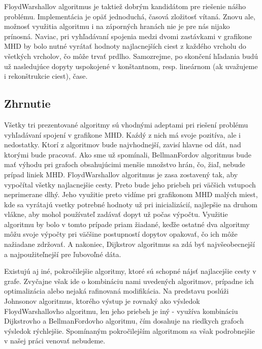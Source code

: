 Floyd\textendash Warshallov algoritmus je taktiež dobrým kandidátom pre riešenie nášho problému. Implementácia je opäť jednoduchá, časová zložitosť vítaná. Znovu ale, možnosť využitia algoritmu i na záporných hranách nie je pre nás nijako prínosná. Naviac, pri vyhľadávaní spojenia medzi dvomi zastávkami v grafikone MHD by bolo nutné vyrátať hodnoty najlacnejších ciest z každého vrcholu do všetkých vrcholov, čo môže trvať prdlho. Samozrejme, po skončení hľadania budú už nasledujúce dopyty uspokojené v konštantnom, resp. lineárnom (ak uvažujeme i rekonštrukcie ciest), čase.\newline


\subsection{Zhrnutie}
\label{vyhlad_alg_zhrnutie}

Všetky tri prezentované algoritmy sú vhodnými adeptami pri riešení problému vyhľadávaní spojení v grafikone MHD. Kaźdý z nich má svoje pozitíva, ale i nedostatky. Ktorí z algoritmov bude najvhodnejší, zavisí hlavne od dát, nad ktorými bude pracovať. Ako sme už spomínali, Bellman\textendash Fordov algoritmus bude mať výhodu pri grafoch obsahujúcimi menšie množstvo hrán, čo, žiaľ, nebude prípad liniek MHD. Floyd\textendash Warshallov algoritmus je zasa zostavený tak, aby vypočítal všetky najlacnejšie cesty. Preto bude jeho priebeh pri väčšich vstupoch neprimerane dlhý. Jeho využitie preto vidíme pri grafikonom MHD malých miest, kde sa vyrátajú vsetky potrebné hodnoty už pri inicializácií, najlepšie na druhom vlákne, aby mohol používateľ zadávať dopyt už počas výpočtu. Využitie algoritmu by bolo v tomto prípade priam žiadané, keďže ostatné dva algoritmy môžu svoje výpočty pri väčšine postupností dopytov opakovať, čo ich môže nažiadane zdržovať. A nakoniec, Dijkstrov algoritmus sa zdá byť najvšeobecnejší a najpoužiteľnejší pre ľubovoľné dáta.\newline

Existujú aj iné, pokročilejšie algoritmy, ktoré sú schopné nájsť najlacejšie cesty v grafe. Zvyčajne však ide o kombináciu nami uvedených algoritmov, prípadne ich optimalizácia alebo nejaká rafinovaná modifikácia. Na predstavu poslúži Johnsonov algoritmus, ktorého výstup je rovnaký ako výsledok Floyd\textendash Warshallovho algoritmu, len jeho priebeh je iný - využíva kombináciu Dijkstrovho a Bellman\textendash Fordovho algoritmu, čím dosahuje na riedkych grafoch výsledok rýchlejšie. Spomínaným pokročilejším algoritmom sa však podrobnejšie v našej práci venovať nebudeme.\newline

